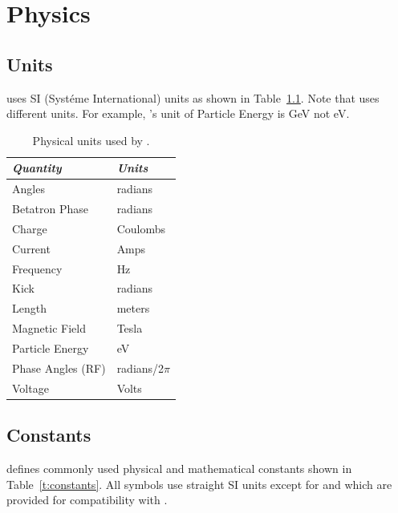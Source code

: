 \chapter{Physics}

\section{Units}
\label{s:units}

\bmad uses SI (Syst\'eme International) units as shown in
Table~\ref{t:units}.  Note that \mad uses different units. For example,
\mad's unit of Particle Energy is GeV not eV.
\begin{table}[ht]
\centering
\begin{tabular}{|l|l|} \hline
  {\em Quantity}     & {\em Units}       \\ \hline
  Angles             &    radians        \\ 
  Betatron Phase     &    radians        \\
  Charge             &    Coulombs       \\
  Current            &    Amps           \\ 
  Frequency          &    Hz             \\ 
  Kick               &    radians        \\ 
  Length             &    meters         \\ 
  Magnetic Field     &    Tesla          \\ 
  Particle Energy    &    eV             \\ 
  Phase Angles (RF)  &    radians/2$\pi$ \\ 
  Voltage            &    Volts          \\ \hline
\end{tabular}
\caption{Physical units used by \bmad.}
\label{t:units}
\end{table}


\section{Constants}
\label{s:constants}

\bmad defines commonly used physical and mathematical constants
shown in Table~\ref{t:constants}.  All symbols use straight SI units
except for  and  which are provided for
compatibility with \mad.

